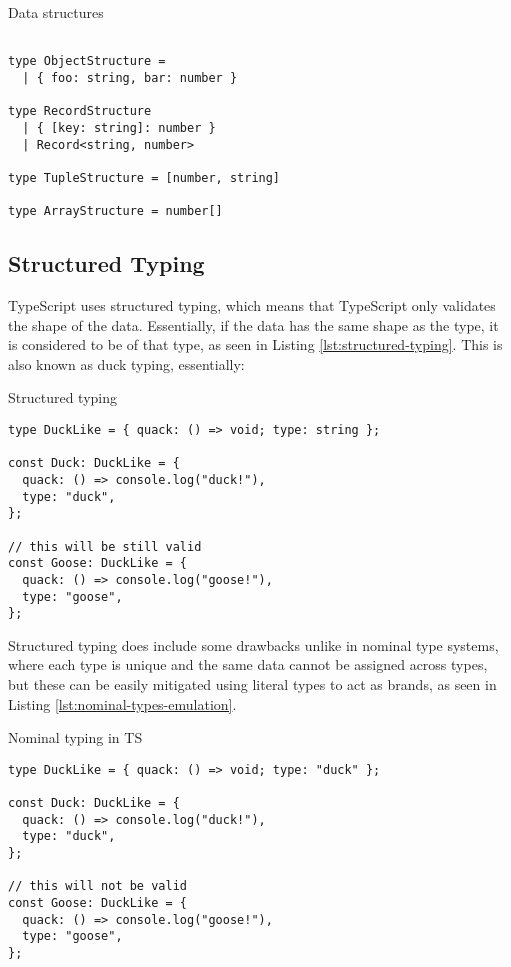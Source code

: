\begin{listing}[h]
  \caption{Data structures}\label{lst:data-structures}
  \begin{verbatim}

type ObjectStructure =  
  | { foo: string, bar: number }

type RecordStructure 
  | { [key: string]: number }
  | Record<string, number>

type TupleStructure = [number, string]

type ArrayStructure = number[]
\end{verbatim}
\end{listing}

\subsection{Structured Typing}

TypeScript uses structured typing, which means that TypeScript only validates the shape of the data. Essentially, if the data has the same shape as the type, it is considered to be of that type, as seen in Listing \ref{lst:structured-typing}. This is also known as duck typing, essentially: 

\begin{listing}[h]
  \caption{Structured typing}\label{lst:structured-typing}
  \begin{verbatim}
type DuckLike = { quack: () => void; type: string };

const Duck: DuckLike = {
  quack: () => console.log("duck!"),
  type: "duck",
};

// this will be still valid
const Goose: DuckLike = {
  quack: () => console.log("goose!"),
  type: "goose",
};
\end{verbatim}
\end{listing}

Structured typing does include some drawbacks unlike in nominal type systems, where each type is unique and the same data cannot be assigned across types, but these can be easily mitigated using literal types to act as brands, as seen in Listing \ref{lst:nominal-types-emulation}.

\begin{listing}[h]
  \caption{Nominal typing in TS}\label{lst:nominal-types-emulation}
  \begin{verbatim}
type DuckLike = { quack: () => void; type: "duck" };

const Duck: DuckLike = {
  quack: () => console.log("duck!"),
  type: "duck",
};

// this will not be valid
const Goose: DuckLike = {
  quack: () => console.log("goose!"),
  type: "goose",
};
\end{verbatim}
\end{listing}

